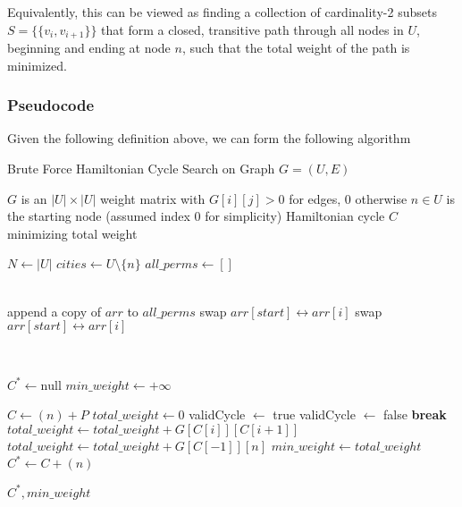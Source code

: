 Equivalently, this can be viewed as finding a collection of cardinality-2 subsets \( S = \{ \{v_i, v_{i+1}\} \} \) that form a closed, transitive path through all nodes in \( U \), beginning and ending at node \( n \), such that the total weight of the path is minimized.


\subsubsection{Pseudocode}
Given the following definition above, we can form the following algorithm
\begin{algorithm}[H]
\caption{Brute Force Hamiltonian Cycle Search on Graph $G = (U, E)$}
\begin{algorithmic}
\Require $G$ is an $|U| \times |U|$ weight matrix with $G[i][j] > 0$ for edges, 0 otherwise
\Require $n \in U$ is the starting node (assumed index 0 for simplicity)
\Ensure Hamiltonian cycle $C$ minimizing total weight

\State $N \gets |U|$
\State $cities \gets U \setminus \{n\}$ 
\State $all\_perms \gets []$

\\
        \State append a copy of $arr$ to $all\_perms$
        \State \Return
    \EndIf
        \State swap $arr[start] \leftrightarrow arr[i]$
        \State {}
        \State swap $arr[start] \leftrightarrow arr[i]$ 
    \EndFor
\EndProcedure

\\
\State {}

\State $C^{*} \gets \text{null}$
\State $min\_weight \gets +\infty$

    \State $C \gets (n) + P$ 
    \State $total\_weight \gets 0$
    \State validCycle $\gets$ true
         
            \State validCycle $\gets$ false
            \State \textbf{break}
        \Else
            \State $total\_weight \gets total\_weight + G[C[i]][C[i+1]]$
        \EndIf
    \EndFor
        \State $total\_weight \gets total\_weight + G[C[-1]][n]$ 
            \State $min\_weight \gets total\_weight$
            \State $C^{*} \gets C + (n)$ 
        \EndIf
    \EndIf
\EndFor

\State \Return $C^{*}, min\_weight$

\end{algorithmic}
\end{algorithm}

